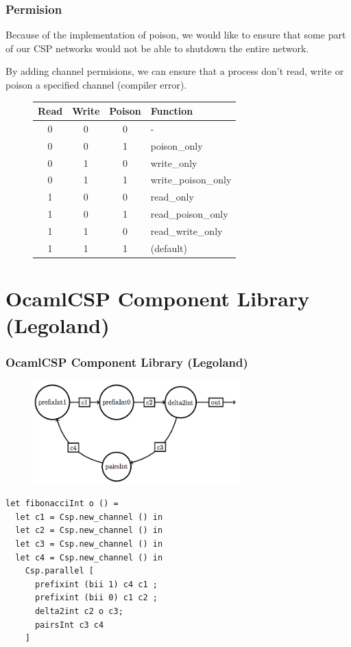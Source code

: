 \documentclass{beamer}
\begin{document}
\begin{frame}
  \frametitle{Permision}
  Because of the implementation of poison, we would like to ensure that some
  part of our CSP networks would not be able to shutdown the entire network.

  By adding channel permisions, we can ensure that a process don't read, write
  or poison a specified channel (compiler error).
  \begin{figure}[h]
    \centering
    \begin{tabular}{c|c|c|l}
      Read & Write & Poison & Function \\
      \hline
      0 & 0 & 0 & - \\
      0 & 0 & 1 & poison\_only \\
      0 & 1 & 0 & write\_only \\
      0 & 1 & 1 & write\_poison\_only \\
      1 & 0 & 0 & read\_only \\
      1 & 0 & 1 & read\_poison\_only \\
      1 & 1 & 0 & read\_write\_only \\
      1 & 1 & 1 & (default) \\
    \end{tabular}
  \end{figure}
\end{frame}

\section[Legoland]{OcamlCSP Component Library (Legoland)}
\begin{frame}[fragile]
  \frametitle{OcamlCSP Component Library (Legoland)}
  \begin{figure}[htp]
    \begin{center}
      \includegraphics[width=8cm,keepaspectratio=true]{figures/fib.png}
    \end{center}
  \end{figure}
\tiny
\begin{verbatim}
let fibonacciInt o () =
  let c1 = Csp.new_channel () in
  let c2 = Csp.new_channel () in
  let c3 = Csp.new_channel () in
  let c4 = Csp.new_channel () in
    Csp.parallel [
      prefixint (bii 1) c4 c1 ;
      prefixint (bii 0) c1 c2 ;
      delta2int c2 o c3;
      pairsInt c3 c4
    ]
\end{verbatim}
\normalsize
\end{frame}
\end{document}
